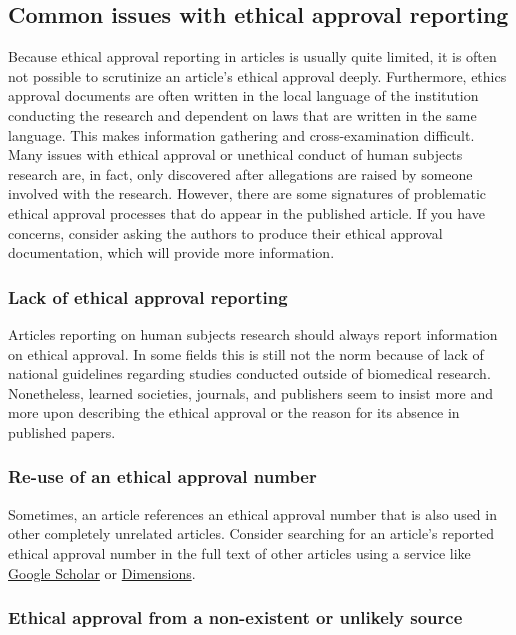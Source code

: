 \documentclass[letterpaper, 12pt]{article}
\begin{document}
\subsection*{Common issues with ethical approval reporting}

Because ethical approval reporting in articles is usually quite limited, it is often not possible to scrutinize an article's ethical approval deeply. Furthermore, ethics approval documents are often written in the local language of the institution conducting the research and dependent on laws that are written in the same language. This makes information gathering and cross-examination difficult. Many issues with ethical approval or unethical conduct of human subjects research are, in fact, only discovered after allegations are raised by someone involved with the research. However, there are some signatures of problematic ethical approval processes that do appear in the published article. If you have concerns, consider asking the authors to produce their ethical approval documentation, which will provide more information.

\subsubsection*{Lack of ethical approval reporting}

Articles reporting on human subjects research should always report information on ethical approval. In some fields this is still not the norm because of lack of national guidelines regarding studies conducted outside of biomedical research. Nonetheless, learned societies, journals, and publishers seem to insist more and more upon describing the ethical approval or the reason for its absence in published papers.

\subsubsection*{Re-use of an ethical approval number}

Sometimes, an article references an ethical approval number that is also used in other completely unrelated articles. Consider searching for an article's reported ethical approval number in the full text of other articles using a service like \href{https://scholar.google.com}{Google Scholar} or \href{https://www.dimensions.ai/}{Dimensions}.

\subsubsection*{Ethical approval from a non-existent or unlikely source}
\end{document}
